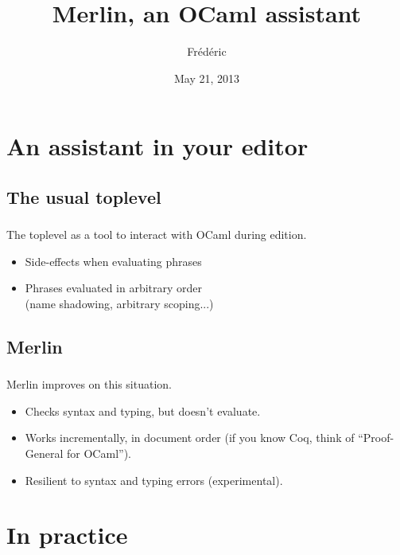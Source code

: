 \documentclass{beamer}
\title{Merlin, an OCaml assistant}
\author{Frédéric \bsc{Bour}}
\date{May 21, 2013}
\newcommand{\sectitle}{\frametitle{\insertsection}}
\begin{document}
\begin{frame}
  \titlepage
\end{frame}


\section{An assistant in your editor}

\subsection{The usual toplevel}

\begin{frame}
  \sectitle

  The toplevel as a tool to interact with OCaml during edition.

  \pause

  \begin{itemize}
    \item Side-effects when evaluating phrases
      \pause
    \item Phrases evaluated in arbitrary order
      \pause \\
      (name shadowing, arbitrary scoping...)
  \end{itemize}
\end{frame}

\subsection{Merlin}

\begin{frame}
  \sectitle

  Merlin improves on this situation.
  \pause

  \begin{itemize}
    \item Checks syntax and typing, but doesn't evaluate.
      \pause
    \item Works incrementally, in document order
      (if you know Coq, think of ``Proof-General for OCaml'').
      \pause
    \item Resilient to syntax and typing errors (experimental).
  \end{itemize}
\end{frame}

\section{In practice}
\end{document}
